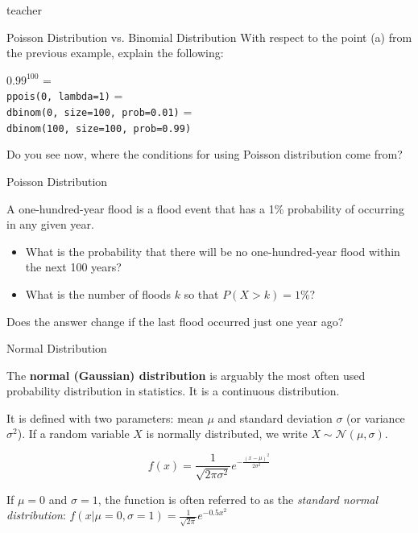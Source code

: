 \begin{shownto}{teacher}
    \begin{frame}{Poisson Distribution vs. Binomial Distribution}
    With respect to the point (a) from the previous example, explain the following:
    \vspace{10pt}
    
    $0.99^{100}$ = \\
    {\small\texttt{ppois(0, lambda=1)}} = \\
    {\small\texttt{dbinom(0, size=100, prob=0.01)}} = \\
    {\small\texttt{dbinom(100, size=100, prob=0.99)}}
    \vspace{10pt}
    
    \pause
    Do you see now, where the conditions for using Poisson distribution come from?
    \end{frame}
\end{shownto}

\begin{frame}{Poisson Distribution}
    \begin{example}
        \medskip
        A one-hundred-year flood is a flood event that has a 1\% probability of occurring in any given year.
        \begin{itemize}
            \item What is the probability that there will be no one-hundred-year flood within the next 100 years?
            \item What is the number of floods $k$ so that $P(X > k) = 1\%$?
        \end{itemize}
        Does the answer change if the last flood occurred just one year ago?
    \end{example}
\end{frame}

\begin{frame}{Normal Distribution}

    The \textbf{normal (Gaussian) distribution} is arguably the most often used probability distribution in statistics. It is a continuous distribution.
    
    It is defined with two parameters: mean $\mu$ and standard deviation $\sigma$ (or variance $\sigma^2$). If a random variable $X$ is normally distributed, we write $X \sim \mathcal{N}(\mu, \sigma)$.
    
    \begin{equation}
    f(x) = \frac{1}{\sqrt{2\pi\sigma^2}} e ^{-\frac{(x - \mu)^2}{2\sigma^2}}
    \end{equation}
    
    If $\mu = 0$ and $\sigma = 1$, the function is often referred to as the \emph{standard normal distribution}: $f(x|\mu=0,\sigma=1) = \frac{1}{\sqrt{2\pi}} e ^{-0.5 x^2}$

\end{frame}

